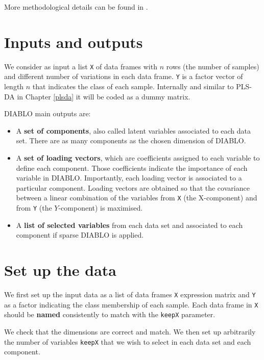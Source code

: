 \documentclass[]{book}
\theoremstyle{definition}
\theoremstyle{definition}
\theoremstyle{definition}
\theoremstyle{remark}
\begin{document}
More methodological details can be found in \citep{Sin16}.

\section{Inputs and outputs}\label{inputs-and-outputs-2}

We consider as input a list \texttt{X} of data frames with \(n\) rows
(the number of samples) and different number of variations in each data
frame. \texttt{Y} is a factor vector of length \(n\) that indicates the
class of each sample. Internally and similar to PLS-DA in Chapter
\ref{plsda} it will be coded as a dummy matrix.

DIABLO main outputs are:

\begin{itemize}
\item
  A \textbf{set of components}, also called latent variables associated
  to each data set. There are as many components as the chosen dimension
  of DIABLO.
\item
  A \textbf{set of loading vectors}, which are coefficients assigned to
  each variable to define each component. Those coefficients indicate
  the importance of each variable in DIABLO. Importantly, each loading
  vector is associated to a particular component. Loading vectors are
  obtained so that the covariance between a linear combination of the
  variables from \texttt{X} (the X-component) and from \texttt{Y} (the
  \(Y\)-component) is maximised.
\item
  A \textbf{list of selected variables} from each data set and
  associated to each component if sparse DIABLO is applied.
\end{itemize}

\section{Set up the data}\label{set-up-the-data-2}

We first set up the input data as a list of data frames \texttt{X}
expression matrix and \texttt{Y} as a factor indicating the class
membership of each sample. Each data frame in \texttt{X} should be
\textbf{named} consistently to match with the \texttt{keepX} parameter.

We check that the dimensions are correct and match. We then set up
arbitrarily the number of variables \texttt{keepX} that we wish to
select in each data set and each component.
\end{document}
